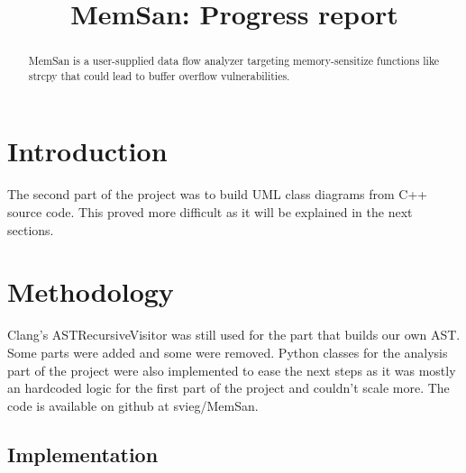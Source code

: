 \documentclass[conference,compsoc]{IEEEtran}
\begin{document}
\title{MemSan: Progress report}

\author{
}

\maketitle
\begin{abstract}
MemSan is a user-supplied data flow analyzer targeting memory-sensitize functions like strcpy that could lead to buffer overflow vulnerabilities.
\end{abstract}

\IEEEpeerreviewmaketitle



\section{Introduction}

The second part of the project was to build UML class diagrams from
 C++ source code. This proved more difficult as it will be explained
 in the next sections. 

\section{Methodology}

Clang's ASTRecursiveVisitor was still used for the part
 that builds our own AST. Some parts were added and some
 were removed. Python classes for the analysis part of the project
 were also implemented to ease the next steps as it was mostly an hardcoded
 logic for the first part of the project and couldn't scale more.
 The code is available on github at svieg/MemSan.

\subsection{Implementation}
\end{document}
